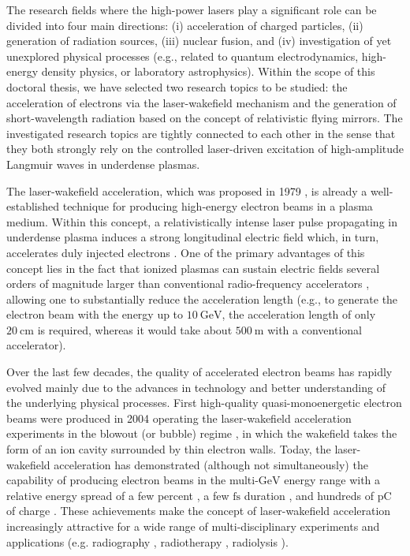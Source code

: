 \documentclass[10pt, a4paper, twoside, openright]{report}
\begin{document}
The research fields where the high-power lasers play a significant role can be divided into four main directions: (i) acceleration of charged particles, (ii) generation of radiation sources, (iii) nuclear fusion, and (iv) investigation of yet unexplored physical processes (e.g., related to quantum electrodynamics, high-energy density physics, or laboratory astrophysics). Within the scope of this doctoral thesis, we have selected two research topics to be studied: the acceleration of electrons via the laser-wakefield mechanism and the generation of short-wavelength radiation based on the concept of relativistic flying mirrors. The investigated research topics are tightly connected to each other in the sense that they both strongly rely on the controlled laser-driven excitation of high-amplitude Langmuir waves in underdense plasmas.

The laser-wakefield acceleration, which was proposed in 1979 \cite{Tajima1979}, is already a well-established technique for producing high-energy electron beams in a plasma medium. Within this concept, a relativistically intense laser pulse propagating in underdense plasma induces a strong longitudinal electric field which, in turn, accelerates duly injected electrons \cite{Esarey1996, Esarey2009, Hooker2013, Bulanov2016}. One of the primary advantages of this concept lies in the fact that ionized plasmas can sustain electric fields several orders of magnitude larger than conventional radio-frequency accelerators \cite{Dawson1959}, allowing one to substantially reduce the acceleration length (e.g., to generate the electron beam with the energy up to $ 10 \ \mathrm{GeV} $, the acceleration length of only $ 20 \ \mathrm{cm} $ is required, whereas it would take about $ 500 \ \mathrm{m} $ with a conventional accelerator).

Over the last few decades, the quality of accelerated electron beams has rapidly evolved mainly due to the advances in technology and better understanding of the underlying physical processes. First high-quality quasi-monoenergetic electron beams were produced in 2004 \cite{Faure2004, Geddes2004, Mangles2004} operating the laser-wakefield acceleration experiments in the blowout (or bubble) regime \cite{Pukhov2002, Lu2006, Lu2007}, in which the wakefield takes the form of an ion cavity surrounded by thin electron walls. Today, the laser-wakefield acceleration has demonstrated (although not simultaneously) the capability of producing electron beams in the multi-$ \mathrm{GeV} $ energy range with a relative energy spread of a few percent \cite{Kim2013, Leemans2014, Gonsalves2019}, a few $ \mathrm{fs} $ duration \cite{Tilborg2006, Ohkubo2007, Debus2010, Lundh2011}, and hundreds of $ \mathrm{pC} $ of charge \cite{Couperus2017}. These achievements make the concept of laser-wakefield acceleration increasingly attractive for a wide range of multi-disciplinary experiments and applications (e.g. radiography \cite{Glinec2005}, radiotherapy \cite{Malka2010, DesRosiers2000}, radiolysis \cite{Malka2010, Gauduel2010}).
\end{document}
